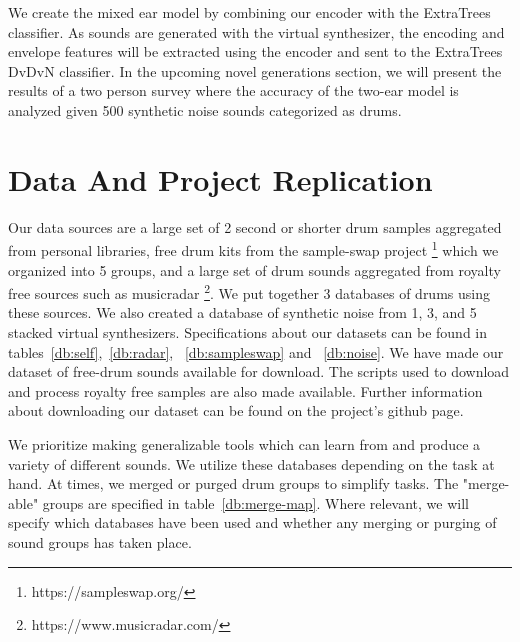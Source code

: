 \documentclass[\main/thesis.tex]{subfiles}
\begin{document}
We create the mixed ear model by combining our encoder with the ExtraTrees classifier. As sounds are generated with the virtual synthesizer, the encoding and envelope features will be extracted using the encoder and sent to the ExtraTrees DvDvN classifier. In the upcoming novel generations section, we will present the results of a two person survey where the accuracy of the two-ear model is analyzed given 500 synthetic noise sounds categorized as drums. 



\section{Data And Project Replication}

Our data sources are a large set of 2 second or shorter drum samples aggregated from personal libraries, free drum kits from the sample-swap project \footnote{https://sampleswap.org/} which we organized into 5 groups, and a large set of drum sounds aggregated from royalty free sources such as musicradar \footnote{https://www.musicradar.com/}. We put together 3 databases of drums using these sources. We also created a database of synthetic noise from 1, 3, and 5 stacked virtual synthesizers. Specifications about our datasets can be found in tables~\ref{db:self},~\ref{db:radar}, ~\ref{db:sampleswap} and ~\ref{db:noise}. We have made our dataset of free-drum sounds available for download. The scripts used to download and process royalty free samples are also made available. Further information about downloading our dataset can be found on the project's github page. 

We prioritize making generalizable tools which can learn from and produce a variety of different sounds. We utilize these databases depending on the task at hand. At times, we merged or purged drum groups to simplify tasks. The "merge-able" groups are specified in table~\ref{db:merge-map}. Where relevant, we will specify which databases have been used and whether any merging or purging of sound groups has taken place. 

\end{document}
